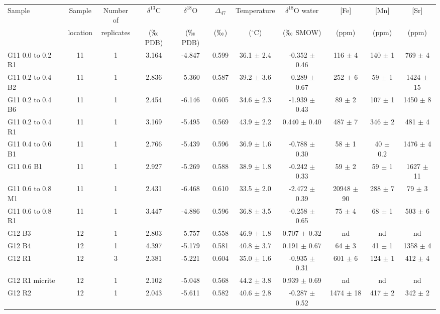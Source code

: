\documentclass{article}
\newcommand{\deltao}{$\delta^{18}$}
\newcommand{\deltac}{$\delta^{13}$}
\newcommand{\degrees}{$^{\circ}$}
\begin{document}
\begin{sidewaystable}[htbp]
\centering
\small
\begin{tabular}{ | l | c | c | c | c | c | c | c | c | c | c | }
\multirow{2}{*}{Sample} & Sample & Number of & \deltac C & \deltao O & $\Delta_{47}$ & Temperature & \deltao O water & [Fe] & [Mn] & [Sr] \\
 & location & replicates & ($\permil$ PDB) & ($\permil$ PDB) & ($\permil$) & (\degrees C) & ($\permil$ SMOW) & (ppm) & (ppm) & (ppm)\\ \hline
G11 0.0 to 0.2 R1 & 11 & 1 & 3.164 & -4.847 & 0.599 & 36.1 $\pm$ 2.4 & -0.352 $\pm$ 0.46 & 116 $\pm$ 4 & 140 $\pm$ 1 & 769 $\pm$ 4 \\
G11 0.2 to 0.4 B2 & 11 & 1 & 2.836 & -5.360 & 0.587 & 39.2 $\pm$ 3.6 & -0.289 $\pm$ 0.67 & 252 $\pm$ 6 & 59 $\pm$ 1 & 1424 $\pm$ 15 \\
G11 0.2 to 0.4 B6 & 11 & 1 & 2.454 & -6.146 & 0.605 & 34.6 $\pm$ 2.3 & -1.939 $\pm$ 0.43 & 89 $\pm$ 2 & 107 $\pm$ 1 & 1450 $\pm$ 8 \\
G11 0.2 to 0.4 R1 & 11 & 1 & 3.169 & -5.495 & 0.569 & 43.9 $\pm$ 2.2 & 0.440 $\pm$ 0.40 & 487 $\pm$ 7 & 346 $\pm$ 2 & 481 $\pm$ 4 \\
G11 0.4 to 0.6 B1 & 11 & 1 & 2.766 & -5.439 & 0.596 & 36.9 $\pm$ 1.6 & -0.788 $\pm$ 0.30 & 58 $\pm$ 1 & 40 $\pm$ 0.2 & 1476 $\pm$ 4 \\
G11 0.6 B1 & 11 & 1 & 2.927 & -5.269 & 0.588 & 38.9 $\pm$ 1.8 & -0.242 $\pm$ 0.33 & 59 $\pm$ 2 & 59 $\pm$ 1 & 1627 $\pm$ 11 \\
G11 0.6 to 0.8 M1 & 11 & 1 & 2.431 & -6.468 & 0.610 & 33.5 $\pm$ 2.0 & -2.472 $\pm$ 0.39 & 20948 $\pm$ 90 & 288 $\pm$ 7 & 79 $\pm$ 3 \\
G11 0.6 to 0.8 R1 & 11 & 1 & 3.447 & -4.886 & 0.596 & 36.8 $\pm$ 3.5 & -0.258 $\pm$ 0.65 & 75 $\pm$ 4 & 68 $\pm$ 1 & 503 $\pm$ 6 \\
G12 B3 & 12 & 1 & 2.803 & -5.757 & 0.558 & 46.9 $\pm$ 1.8 & 0.707 $\pm$ 0.32 &  nd  &  nd  &  nd  \\
G12 B4 & 12 & 1 & 4.397 & -5.179 & 0.581 & 40.8 $\pm$ 3.7 & 0.191 $\pm$ 0.67 & 64 $\pm$ 3 & 41 $\pm$ 1 & 1358 $\pm$ 4 \\
G12 R1 & 12 & 3 & 2.381 & -5.221 & 0.604 & 35.0 $\pm$ 1.6 & -0.935 $\pm$ 0.31 & 601 $\pm$ 6 & 124 $\pm$ 1 & 412 $\pm$ 4 \\
G12 R1 micrite & 12 & 1 & 2.102 & -5.048 & 0.568 & 44.2 $\pm$ 3.8 & 0.939 $\pm$ 0.69 &  nd  &  nd  &  nd  \\
G12 R2 & 12 & 1 & 2.043 & -5.611 & 0.582 & 40.6 $\pm$ 2.8 & -0.287 $\pm$ 0.52 & 1474 $\pm$ 18 & 417 $\pm$ 2 & 342 $\pm$ 2 \\

\end{tabular}
\end{sidewaystable}
\end{document}
